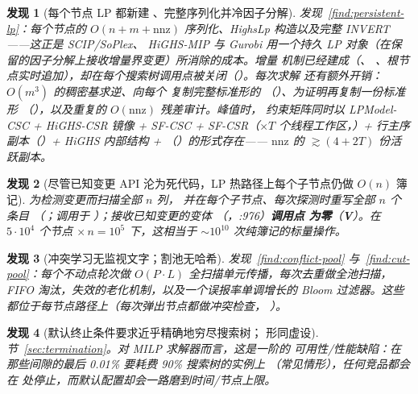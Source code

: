 \documentclass[11pt]{ctexart}
\newtheorem{finding}{发现}
\newcommand{\nnz}{\mathrm{nnz}}
\begin{document}
\begin{finding}[每个节点 LP 都新建 、完整序列化并冷因子分解]
发现~\ref{find:persistent-lp}：每个节点的 $O(n{+}m{+}\nnz)$ 序列化、HighsLp
构造以及完整 INVERT——这正是 SCIP/SoPlex、
HiGHS-MIP 与 Gurobi 用一个持久 LP 对象（在保留的因子分解上接收增量界变更）所消除的成本。增量
机制已经建成（、
、根节点实时追加），却在每个搜索树调用点被关闭（）。每次求解
还有额外开销：$O(m^3)$ 的稠密基求逆、向每个 
复制完整标准形的 
（）、为证明再复制一份标准形
（），以及重复的 $O(\nnz)$ 残差审计。峰值时，
约束矩阵同时以 LPModel-CSC + HiGHS-CSR 镜像 + SF-CSC +
SF-CSR（$\times T$ 个线程工作区，）+
 行主序副本（）+ HiGHS
内部结构 + （）的形式存在——
$\nnz$ 的 $\gtrsim (4 + 2T)$ 份活跃副本。
\end{finding}

\begin{finding}[尽管已知变更 API 沦为死代码，LP 热路径上每个子节点仍做 $O(n)$ 簿记]
 为检测变更而扫描全部 $n$ 列，
并在每个子节点、每次探测时重写全部 $n$ 个  条目
（；调用于 ）；接收已知变更的变体
（，:976）\textbf{调用点
为零}（\textbf{V}）。在 $5\cdot10^4$ 个节点 $\times\, n = 10^5$ 下，这相当于
$\sim 10^{10}$ 次纯簿记的标量操作。
\end{finding}

\begin{finding}[冲突学习无监视文字；割池无哈希]
发现~\ref{find:conflict-pool} 与~\ref{find:cut-pool}：每个不动点轮次做
$O(P{\cdot}L)$ 全扫描单元传播，每次去重做全池扫描，
FIFO 淘汰，失效的老化机制，以及一个误报率单调增长的 Bloom 过滤器。这些都位于每节点路径上（每次弹出节点都做冲突检查，
）。
\end{finding}

\begin{finding}[默认终止条件要求近乎精确地穷尽搜索树； 形同虚设]
节~\ref{sec:termination}。对 MILP 求解器而言，这是一阶的
可用性/性能缺陷：在那些间隙的最后 0.01\% 要耗费 90\% 搜索树的实例上
（常见情形），任何竞品都会在  处停止，而默认配置却会一路磨到时间/节点上限。
\end{finding}
\end{document}
